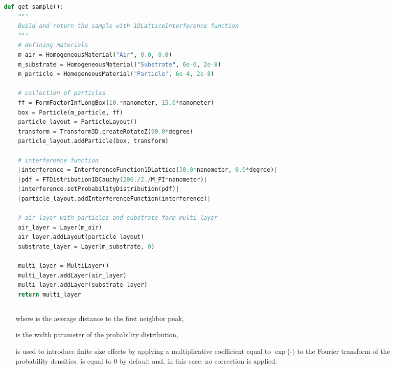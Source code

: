 \newpage
\begin{lstlisting}[language=python, style=eclipseboxed,numbers=none,nolol,caption={\Code{Python} script to generate a sample made of infinitely long boxes deposited on a substrate layer with the 1DLatticeInterference function. The part specific to the interferences is marked in a red italic font.},label={lst:1dlattinterf}]
def get_sample():
    """
    Build and return the sample with 1DLatticeInterference function
    """
    # defining materials
    m_air = HomogeneousMaterial("Air", 0.0, 0.0)
    m_substrate = HomogeneousMaterial("Substrate", 6e-6, 2e-8)
    m_particle = HomogeneousMaterial("Particle", 6e-4, 2e-8)

    # collection of particles
    ff = FormFactorInfLongBox(10.*nanometer, 15.0*nanometer)
    box = Particle(m_particle, ff)
    particle_layout = ParticleLayout()
    transform = Transform3D.createRotateZ(90.0*degree)
    particle_layout.addParticle(box, transform)

    # interference function
    |interference = InterferenceFunction1DLattice(30.0*nanometer, 0.0*degree)|
    |pdf = FTDistribution1DCauchy(200./2./M_PI*nanometer)|
    |interference.setProbabilityDistribution(pdf)|
    |particle_layout.addInterferenceFunction(interference)|

    # air layer with particles and substrate form multi layer
    air_layer = Layer(m_air)
    air_layer.addLayout(particle_layout)
    substrate_layer = Layer(m_substrate, 0)

    multi_layer = MultiLayer()
    multi_layer.addLayer(air_layer)
    multi_layer.addLayer(substrate_layer)
    return multi_layer
\end{lstlisting} 

\newpage
\subsection{}  
\begin{itemize}
\item[where]  is the average distance to the first neighbor peak, 
\item[] is the width parameter of the probability distribution,
\item[]  is used to introduce finite size effects by applying a multiplicative coefficient equal to  $\exp$(-) to the Fourier transform of the probability densities.  is equal to 0 by default and, in this case, no correction is applied.
\end{itemize}

